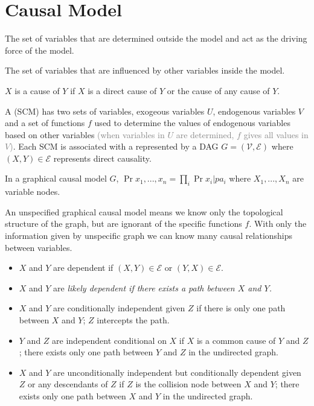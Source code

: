 \documentclass{article}
\title{\bt{\huge{Notes for Causal Inference}}}
\author{MoeKid101}
\date{}
\begin{document}
\maketitle

\section{Causal Model}

 The set of variables that are determined outside the model and act as the driving force of the model.

 The set of variables that are influenced by other variables inside the model.

 $X$ is a cause of $Y$ if $X$ is a direct cause of $Y$ or the cause of any cause of $Y$.

A  (SCM) has two sets of variables, exogeous variables $U$, endogenous variables $V$ and a set of functions $f$ used to determine the values of endogenous variables based on other variables \textcolor{gray}{(when variables in $U$ are determined, $f$ gives all values in $V$)}. Each SCM is associated with a  represented by a DAG $G=(\mathcal{V}, \mathcal{E})$ where $(X,Y) \in \mathcal{E}$ represents direct causality.

 In a graphical causal model $G$, $\Pr{x_1,...,x_n}=\prod_i \Pr{x_i | pa_i}$ where $X_1,...,X_n$ are variable nodes.

An unspecified graphical causal model means we know only the topological structure of the graph, but are ignorant of the specific functions $f$. With only the information given by unspecific graph we can know many causal relationships between variables.
\begin{itemize}
	\item
	$X$ and $Y$ are dependent if $(X,Y)\in\mathcal{E}$ or $(Y,X)\in\mathcal{E}$.
	\item
	$X$ and $Y$ are \it{likely} dependent if there exists a path between $X$ and $Y$.
	\item
	$X$ and $Y$ are conditionally independent given $Z$ if  there is only one path between $X$ and $Y$;  $Z$ intercepts the path.
	\item
	$Y$ and $Z$ are independent conditional on $X$ if  $X$ is a common cause of $Y$ and $Z$;  there exists only one path between $Y$ and $Z$ in the undirected graph.
	\item
	$X$ and $Y$ are unconditionally independent but conditionally dependent given $Z$ or any descendants of $Z$ if  $Z$ is the collision node between $X$ and $Y$;  there exists only one path between $X$ and $Y$ in the undirected graph.
\end{itemize}
\end{document}
